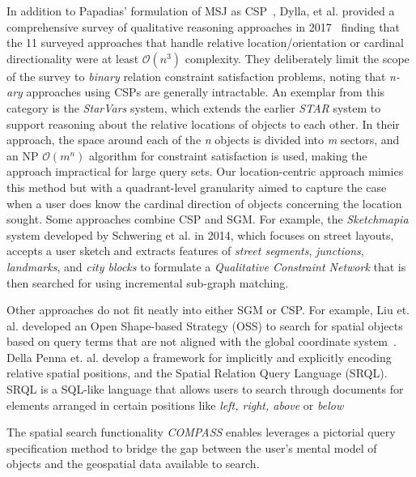    \par{
    In addition to Papadias' formulation of MSJ as CSP~\cite{Papadias1998}, Dylla, et al. provided a comprehensive survey of qualitative reasoning approaches in 2017~\cite{Dylla2017} finding that the 11 surveyed approaches that handle relative location/orientation or cardinal directionality were at least $\mathcal{O}(n^3)$ complexity. 
    They deliberately limit the scope of the survey to \textit{binary} relation constraint satisfaction problems, noting that \textit{n-ary} approaches using CSPs are generally intractable.
    An exemplar from this category is the \textit{StarVars} system, which extends the earlier \textit{STAR} system to support reasoning about the relative locations of objects to each other.
    In their approach, the space around each of the \textit{n} objects is divided into \textit{m} sectors, and an NP $\mathcal{O}(m^n)$ algorithm for constraint satisfaction is used, making the approach impractical for large query sets.
    Our location-centric approach mimics this method but with a quadrant-level granularity aimed to capture the case when a user does know the cardinal direction of objects concerning the location sought. 
    Some approaches combine CSP and SGM. For example, the \textit{Sketchmapia} system developed by Schwering et al. in 2014, which focuses on street layouts, accepts a user sketch and extracts features of \textit{street segments}, \textit{junctions}, \textit{landmarks}, and \textit{city blocks} to formulate a \textit{Qualitative Constraint Network} that is then searched for using incremental sub-graph matching.
}    

\par{
    Other approaches do not fit neatly into either SGM or CSP. For example, Liu et. al. developed an Open Shape-based Strategy (OSS) to search for spatial objects based on query terms that are not aligned with the global coordinate system~\cite{Liu2003}.
    Della Penna et. al. develop a framework for implicitly and explicitly encoding relative spatial positions, and the Spatial Relation Query Language (SRQL).  
    SRQL is a SQL-like language that allows users to search through documents for elements arranged in certain positions like \textit{left, right, above} or \textit{below}~\cite{Dellapenna2012, Dellapenna2017}
}


\par{The spatial search functionality \emph{COMPASS} enables leverages a pictorial query specification method to bridge the gap between the user's mental model of objects and the geospatial data available to search. 



}

